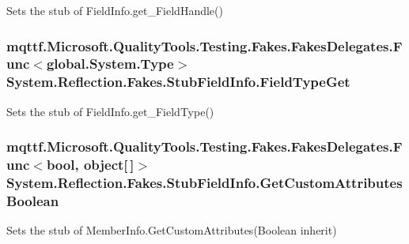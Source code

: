 Sets the stub of Field\-Info.\-get\-\_\-\-Field\-Handle()

\hypertarget{class_system_1_1_reflection_1_1_fakes_1_1_stub_field_info_a7ed870f09a9e961b61001c6d1293462d}{
\subsubsection[{Field\-Type\-Get}]{\setlength{\rightskip}{0pt plus 5cm}mqttf.\-Microsoft.\-Quality\-Tools.\-Testing.\-Fakes.\-Fakes\-Delegates.\-Func$<$global.\-System.\-Type$>$ System.\-Reflection.\-Fakes.\-Stub\-Field\-Info.\-Field\-Type\-Get}}\label{class_system_1_1_reflection_1_1_fakes_1_1_stub_field_info_a7ed870f09a9e961b61001c6d1293462d}


Sets the stub of Field\-Info.\-get\-\_\-\-Field\-Type()

\hypertarget{class_system_1_1_reflection_1_1_fakes_1_1_stub_field_info_ad9f577a61d074a15b0d6b1174bbc6a04}{
\subsubsection[{Get\-Custom\-Attributes\-Boolean}]{\setlength{\rightskip}{0pt plus 5cm}mqttf.\-Microsoft.\-Quality\-Tools.\-Testing.\-Fakes.\-Fakes\-Delegates.\-Func$<$bool, object\mbox{[}$\,$\mbox{]}$>$ System.\-Reflection.\-Fakes.\-Stub\-Field\-Info.\-Get\-Custom\-Attributes\-Boolean}}\label{class_system_1_1_reflection_1_1_fakes_1_1_stub_field_info_ad9f577a61d074a15b0d6b1174bbc6a04}


Sets the stub of Member\-Info.\-Get\-Custom\-Attributes(\-Boolean inherit)


